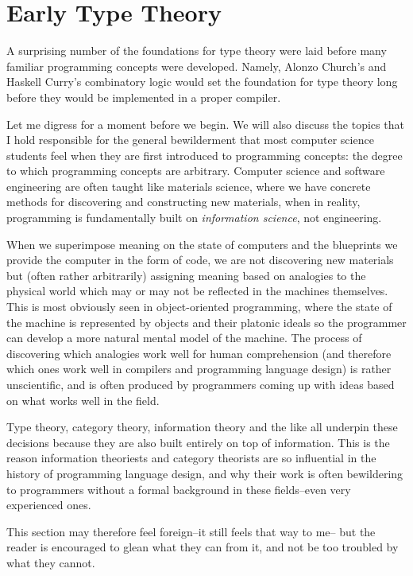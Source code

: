 \section{Early Type Theory}

A surprising number of the foundations for type theory were laid before
many familiar programming concepts were developed.
Namely, Alonzo Church's \lambdacalc{} and Haskell Curry's combinatory logic
would set the foundation for type theory long before they would be implemented in
a proper compiler.

Let me digress for a moment before we begin.
We will also discuss the topics that I hold responsible for the general
bewilderment that most computer science students feel when they are first
introduced to programming concepts: the degree to which programming concepts
are arbitrary.
Computer science and software engineering are often taught like materials science,
where we have concrete methods for discovering and constructing new materials,
when in reality, programming is fundamentally built on \textit{information science},
not engineering.

When we superimpose meaning on the state of computers and the blueprints
we provide the computer in the form of code, we are not discovering new materials
but (often rather arbitrarily) assigning meaning based on analogies to the physical
world which may or may not be reflected in the machines themselves.
This is most obviously seen in object-oriented programming, where the state of
the machine is represented by objects and their platonic ideals so the programmer
can develop a more natural mental model of the machine.
The process of discovering which analogies work well for human comprehension
(and therefore which ones work well in compilers and programming language design)
is rather unscientific, and is often produced by programmers coming up with
ideas based on what works well in the field.

Type theory, category theory, information theory and the like all underpin
these decisions because they are also built entirely on top of information.
This is the reason information theoriests and category theorists are so
influential in the history of programming language design, and why their
work is often bewildering to programmers without a formal background
in these fields--even very experienced ones.

This section may therefore feel foreign--it still feels that way to me--
but the reader is encouraged to glean what they can from it, and not be too
troubled by what they cannot.

